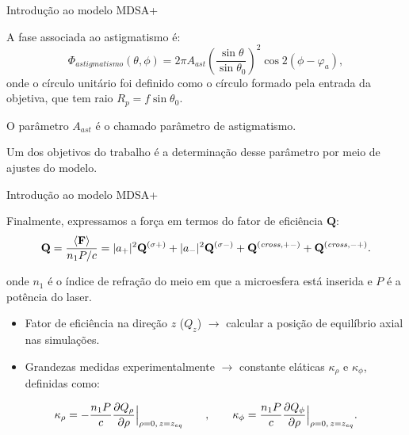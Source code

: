\documentclass[10pt]{beamer}
\begin{document}
\begin{frame}[fragile]{Introdução ao modelo MDSA+}

    \begin{center}
        A fase associada ao astigmatismo é:
        \begin{equation}
        \Phi_{astigmatismo}(\theta,\phi) = 2\pi A_{ast}\left( \frac{\sin\theta}{\sin\theta_0} \right)^2\cos2(\phi - \varphi_a),
        \end{equation}
        onde o círculo unitário foi definido como o círculo formado pela entrada da objetiva, que tem raio $R_p=f\sin\theta_0$.

        O parâmetro $A_{ast}$ é o chamado parâmetro de astigmatismo. 

        Um dos objetivos do trabalho é a determinação desse parâmetro por meio de ajustes do modelo.

    \end{center}

\end{frame}

\begin{frame}[fragile]{Introdução ao modelo MDSA+}

    \begin{center}
        Finalmente, expressamos a força em termos do fator de eficiência $\mathbf{Q}$:
        \begin{equation}
        {\mathbf Q} = \frac{\left<{\mathbf F}\right>}{n_1 P/c}= |a_+|^2{\mathbf Q}^{(\sigma +)} + |a_-|^2{\mathbf Q}^{(\sigma -)} + {\mathbf Q}^{({\it cross},+-)} + {\mathbf Q}^{({\it cross},-+)}.
        \end{equation}
        
        onde $n_1$ é o índice de refração do meio em que a microesfera está inserida e $P$ é a potência do laser.
        \begin{itemize}

        	\item Fator de eficiência na direção $z$ ($Q_z$) $\rightarrow$ calcular a posição de equilíbrio axial nas simulações. 

        	\item Grandezas medidas experimentalmente $\rightarrow$ constante eláticas $\kappa_\rho$ e $\kappa_\phi$, definidas como:
        \end{itemize}

        \begin{equation}
        \kappa_\rho=-\frac{n_1 P}{c}\frac{\partial Q_\rho}{\partial \rho}\Big{|}_{\rho=0, \thinspace z=z_{eq}} \qquad, \qquad \kappa_\phi=\frac{n_1 P}{c}\frac{\partial Q_\phi}{\partial \rho}\Big{|}_{\rho=0, \thinspace z=z_{eq}}.
        \end{equation}
%
    \end{center}

\end{frame}
\end{document}
